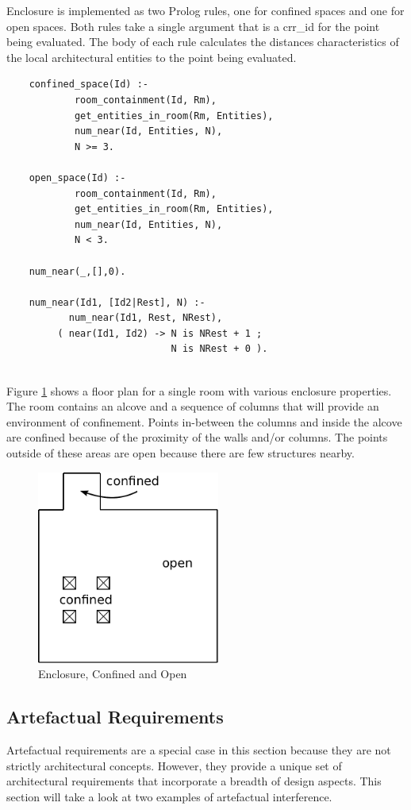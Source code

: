 \documentclass[12pt]{ucthesis}
\begin{document}
Enclosure is implemented as two Prolog rules, one for confined spaces and one for open spaces. Both rules take a single argument that is a crr\_id for the point being evaluated. The body of each rule calculates the distances characteristics of the local architectural entities to the point being evaluated.
\begin{verbatim}
    confined_space(Id) :-
            room_containment(Id, Rm),
            get_entities_in_room(Rm, Entities),
            num_near(Id, Entities, N),
            N >= 3.            
            
    open_space(Id) :-
            room_containment(Id, Rm),
            get_entities_in_room(Rm, Entities),
            num_near(Id, Entities, N),  
            N < 3.

    num_near(_,[],0).

    num_near(Id1, [Id2|Rest], N) :-
           num_near(Id1, Rest, NRest),
         ( near(Id1, Id2) -> N is NRest + 1 ;
                             N is NRest + 0 ).


\end{verbatim} 

Figure \ref{enclosure} shows a floor plan for a single room with various enclosure properties. The room contains an alcove and a sequence of columns that will provide an environment of confinement. Points in-between the columns and inside the alcove are confined because of the proximity of the walls and/or columns. The points outside of these areas are open because there are few structures nearby.

\begin{figure}[H]
\centering
\includegraphics[width=60mm]{spacious-confined}
\caption{Enclosure, Confined and Open}
\label{enclosure}
\end{figure}


\subsection{Artefactual Requirements}
Artefactual requirements are a special case in this section because they are not strictly architectural concepts. However, they provide a unique set of architectural requirements that incorporate a breadth of design aspects. This section will take a look at two examples of artefactual interference. 
\end{document}
